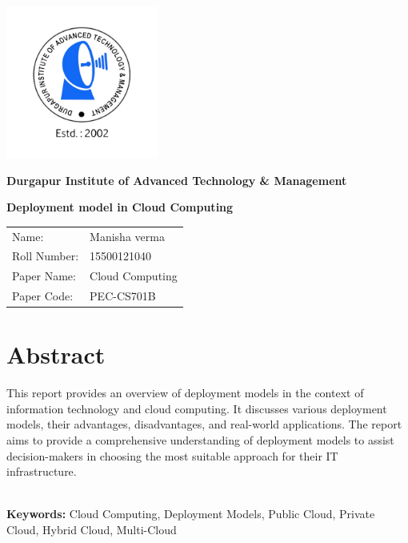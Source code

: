 \documentclass[12pt]{report}
\begin{document}
\begin{titlepage}
    \centering
    \includegraphics[width=5cm]{transparent logo.png}

    \Large \textbf{Durgapur Institute of Advanced Technology \& Management}
    \vspace{6cm}

    \Large \textbf{Deployment model in Cloud Computing}\par
    \vspace{1cm}

    \large
    \begin{tabular}{l l}
        Name:        & Manisha verma   \\
        Roll Number: & 15500121040     \\
        Paper Name:  & Cloud Computing \\
        Paper Code:  & PEC-CS701B      \\
    \end{tabular}
\end{titlepage}

\tableofcontents

\newpage
\section*{Abstract}
This report provides an overview of deployment models in the context of information technology and cloud computing. It discusses various deployment models, their advantages, disadvantages, and real-world applications. The report aims to provide a comprehensive understanding of deployment models to assist decision-makers in choosing the most suitable approach for their IT infrastructure.

\textbf{\\Keywords:} Cloud Computing, Deployment Models, Public Cloud, Private Cloud, Hybrid Cloud, Multi-Cloud

\newpage
\end{document}
